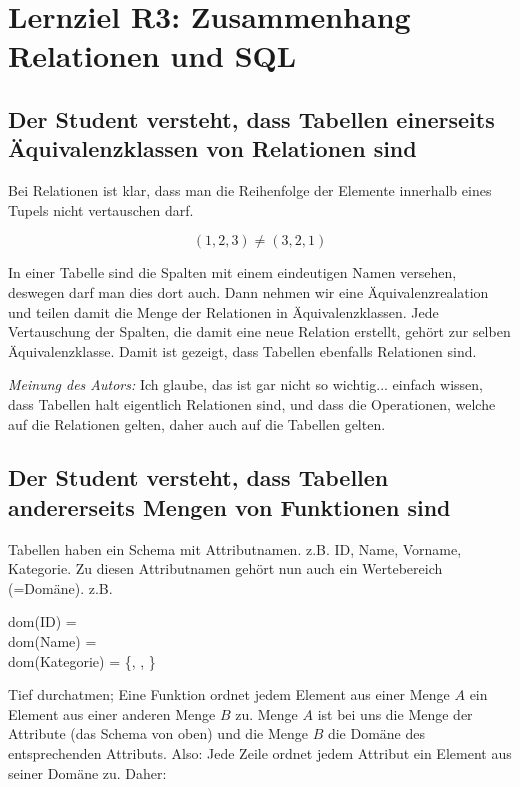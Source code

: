 \section{Lernziel R3: Zusammenhang Relationen und SQL}

\subsection{Der Student versteht, dass Tabellen einerseits Äquivalenzklassen von Relationen sind}
Bei Relationen ist klar, dass man die Reihenfolge der Elemente innerhalb eines Tupels nicht vertauschen darf.

\begin{equation*}
  (1,2,3) \neq (3,2,1)
\end{equation*}

In einer Tabelle sind die Spalten mit einem eindeutigen Namen versehen, deswegen darf man dies dort auch. Dann nehmen wir eine Äquivalenzrealation und teilen damit die Menge der Relationen in Äquivalenzklassen. Jede Vertauschung der Spalten, die damit eine neue Relation erstellt, gehört zur selben Äquivalenzklasse. Damit ist gezeigt, dass Tabellen ebenfalls Relationen sind.

\emph{Meinung des Autors:} Ich glaube, das ist gar nicht so wichtig... einfach wissen, dass Tabellen halt eigentlich Relationen sind, und dass die Operationen, welche auf die Relationen gelten, daher auch auf die Tabellen gelten.

\subsection{Der Student versteht, dass Tabellen andererseits Mengen von Funktionen sind}
Tabellen haben ein Schema mit Attributnamen. z.B. ID, Name, Vorname, Kategorie. Zu diesen Attributnamen gehört nun auch ein Wertebereich (=Domäne). z.B.

\begin{center}
  dom(ID) =  \\
  dom(Name) =  \\
  dom(Kategorie) = \{, , \}
\end{center}

Tief durchatmen; Eine Funktion ordnet jedem Element aus einer Menge \(A\) ein Element aus einer anderen Menge \(B\) zu. Menge \(A\) ist bei uns die Menge der Attribute (das Schema von oben) und die Menge \(B\) die Domäne des entsprechenden Attributs.
Also: Jede Zeile ordnet jedem Attribut ein Element aus seiner Domäne zu. Daher:

